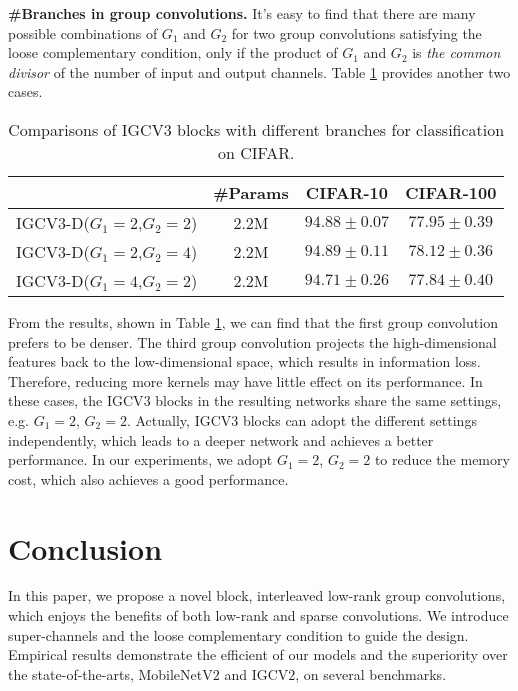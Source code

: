 \documentclass{bmvc2k}
\begin{document}
	\noindent\textbf{\#Branches in group convolutions.} It's easy to find that there are many possible combinations of $G_1$ and $G_2$ for two group convolutions satisfying the loose complementary condition, only if the product of $G_1$ and $G_2$ is \emph{the common divisor} of the number of input and output channels. Table \ref{sparsity} provides another two cases.
	\begin{table}[htb!]
		\centering
		\begin{tabular}{|c||c|c|c|}
			\hline
			& \#Params& CIFAR-10 & CIFAR-100\\
			\hline\hline
			IGCV3-D($G_1=2$,$G_2=2$) & 2.2M  & $94.88\pm0.07$ & $77.95\pm0.39$ \\
			IGCV3-D($G_1=2$,$G_2=4$) & 2.2M  & $\mathbf{94.89\pm0.11}$     &$\mathbf{78.12\pm0.36}$  \\
			IGCV3-D($G_1=4$,$G_2=2$) & 2.2M  & $94.71\pm0.26$     &$77.84\pm0.40$  \\
			\hline
		\end{tabular}
		\caption{Comparisons of IGCV$3$ blocks with different branches for classification on CIFAR.}
		\label{sparsity}
	\end{table}
	
	From the results, shown in Table \ref{sparsity}, we can find that the first group convolution prefers to be denser. The third group convolution projects the high-dimensional features back to the low-dimensional space, which results in information loss. Therefore, reducing more kernels may have little effect on its performance. In these cases, the IGCV$3$ blocks in the resulting networks share the same settings, e.g. $G_1=2$, $G_2=2$. Actually, IGCV$3$ blocks can adopt the different settings independently, which leads to a deeper network and achieves a better performance. In our experiments, we adopt $G_1=2$, $G_2=2$ to reduce the memory cost, which also achieves a good performance.
	
	\section{Conclusion}
	In this paper,
	we propose a novel block, interleaved low-rank group convolutions, 
	which enjoys the benefits of both low-rank and sparse convolutions. 
	We introduce super-channels and the loose complementary condition
	to guide the design. 
	Empirical results demonstrate the efficient of our models and the superiority over the state-of-the-arts, MobileNetV$2$ and IGCV$2$, on several benchmarks.
	
	
\end{document}
